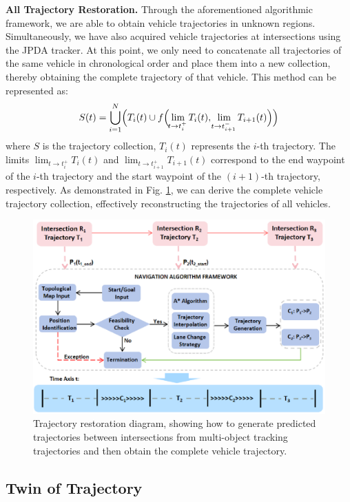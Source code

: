 \documentclass[journal,twoside,web]{ieeecolor}
\begin{document}
\textbf{All Trajectory Restoration.}
Through the aforementioned algorithmic framework, we are able to obtain vehicle trajectories in unknown regions. 
Simultaneously, we have also acquired vehicle trajectories at intersections using the JPDA tracker. 
At this point, we only need to concatenate all trajectories of the same vehicle in chronological order and place them into a new collection, thereby obtaining the complete trajectory of that vehicle. 
This method can be represented as: 
\begin{align}
	S(t) = \bigcup_{i=1}^{N} \Bigl( T_i(t) \cup f\Bigl( \lim_{\!t \to t_i^+} T_i(t), \lim_{\!t \to t_{i+1}^-} T_{i+1}(t) \Bigr) \Bigr)
\end{align}
where \(S\) is the trajectory collection, \(T_i(t)\) represents the \(i\)-th trajectory. 
The limits \(\lim_{t \to t_i^+} T_i(t)\) and \(\lim_{t \to t_{i+1}^+} T_{i+1}(t)\) correspond to the end waypoint of the \(i\)-th trajectory and the start waypoint of the \((i+1)\)-th trajectory, respectively.
As demonstrated in Fig. \ref{fig5}, we can derive the complete vehicle trajectory collection, effectively reconstructing the trajectories of all vehicles.
\begin{figure}[!t]
	\centerline{\includegraphics[width=\columnwidth]{picture/picture5.eps}}
	\caption{Trajectory restoration diagram, showing how to generate predicted trajectories between intersections from multi-object tracking trajectories and then obtain the complete vehicle trajectory.} 
	\label{fig5} 
\end{figure}

\subsection{Twin of Trajectory}
\end{document}
